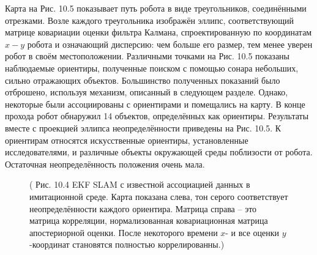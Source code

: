 \documentclass[10pt,a4paper]{article}
\begin{document}
Карта на Рис. 10.5 показывает путь робота в виде треугольников, соединёнными отрезками. Возле каждого треугольника изображён эллипс, соответствующий матрице ковариации оценки фильтра Калмана, спроектированную по координатам $x-y$ робота и означающий дисперсию: чем больше его размер, тем менее уверен робот в своём местоположении.  Различными точками на Рис. 10.5 показаны наблюдаемые ориентиры, полученные поиском с помощью сонара небольших, сильно отражающих объектов. Большинство полученных показаний было отброшено, используя механизм, описанный в следующем разделе. Однако, некоторые были ассоциированы с ориентирами и помещались на карту. В конце прохода робот обнаружил 14 объектов, определённых как ориентиры. Результаты вместе с проекцией эллипса неопределённости приведены на Рис. 10.5. К ориентирам относятся искусственные ориентиры, установленные исследователями, и различные объекты окружающей среды поблизости от робота. Остаточная неопределённость положения очень мала.

\begin{figure}[H]
	\caption{ ( Рис. 10.4 EKF SLAM с известной ассоциацией данных в имитационной среде. Карта показана слева, тон серого соответствует неопределённости каждого ориентира. Матрица справа – это матрица корреляции, нормализованная ковариационная матрица апостериорной оценки. После некоторого времени $x$- и все оценки $y$-координат становятся полностью коррелированны.)}
	\label{fig:104orig}
\end{figure}
\end{document}
